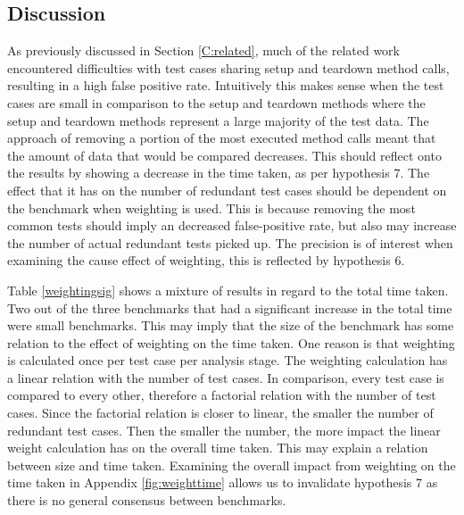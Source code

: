 \subsection{Discussion}
As previously discussed in Section \ref{C:related}, much of the related work encountered difficulties with test cases sharing setup and teardown method calls, resulting in a high false positive rate. Intuitively this makes sense when the test cases are small in comparison to the setup and teardown methods where the setup and teardown methods represent a large majority of the test data. The approach of removing a portion of the most executed method calls meant that the amount of data that would be compared decreases. This should reflect onto the results by showing a decrease in the time taken, as per hypothesis 7. The effect that it has on the number of redundant test cases should be dependent on the benchmark when weighting is used. This is because removing the most common tests should imply an decreased false-positive rate, but also may increase the number of actual redundant tests picked up. The precision is of interest when examining the cause effect of weighting, this is reflected by hypothesis 6.

Table \ref{weightingsig} shows a mixture of results in regard to the total time taken. Two out of the three benchmarks that had a significant increase in the total time were small benchmarks. This may imply that the size of the benchmark has some relation to the effect of weighting on the time taken. One reason is that weighting is calculated once per test case per analysis stage. The weighting calculation has a linear relation with the number of test cases. In comparison, every test case is compared to every other, therefore a factorial relation with the number of test cases. Since the factorial relation is closer to linear, the smaller the number of redundant test cases. Then the smaller the number, the more impact the linear weight calculation has on the overall time taken. This may explain a relation between size and time taken. Examining the overall impact from weighting on the time taken in Appendix \ref{fig:weighttime} allows us to invalidate hypothesis 7 as there is no general consensus between benchmarks.

